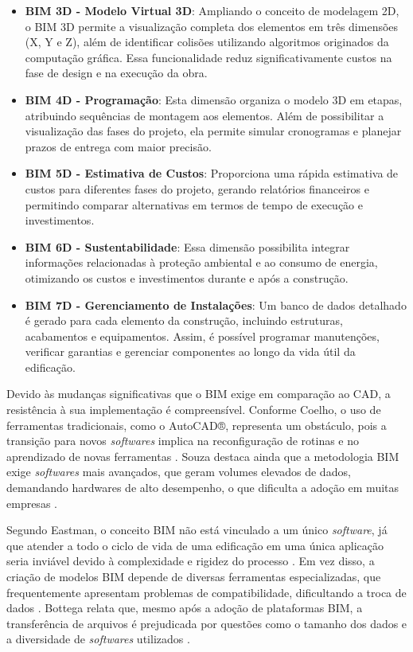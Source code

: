 \begin{itemize}

\item \textbf{BIM 3D - Modelo Virtual 3D}: Ampliando o conceito de modelagem 2D, o BIM 3D permite a visualização completa dos elementos em três dimensões (X, Y e Z), além de identificar colisões utilizando algoritmos originados da computação gráfica. Essa funcionalidade reduz significativamente custos na fase de design e na execução da obra.

\item \textbf{BIM 4D - Programação}: Esta dimensão organiza o modelo 3D em etapas, atribuindo sequências de montagem aos elementos. Além de possibilitar a visualização das fases do projeto, ela permite simular cronogramas e planejar prazos de entrega com maior precisão.

\item \textbf{BIM 5D - Estimativa de Custos}: Proporciona uma rápida estimativa de custos para diferentes fases do projeto, gerando relatórios financeiros e permitindo comparar alternativas em termos de tempo de execução e investimentos.

\item \textbf{BIM 6D - Sustentabilidade}: Essa dimensão possibilita integrar informações relacionadas à proteção ambiental e ao consumo de energia, otimizando os custos e investimentos durante e após a construção.

\item \textbf{BIM 7D - Gerenciamento de Instalações}: Um banco de dados detalhado é gerado para cada elemento da construção, incluindo estruturas, acabamentos e equipamentos. Assim, é possível programar manutenções, verificar garantias e gerenciar componentes ao longo da vida útil da edificação.

\end{itemize}

Devido às mudanças significativas que o BIM exige em comparação ao CAD, a resistência à sua implementação é compreensível. Conforme Coelho, o uso de ferramentas tradicionais, como o AutoCAD®, representa um obstáculo, pois a transição para novos \textit{softwares} implica na reconfiguração de rotinas e no aprendizado de novas ferramentas \cite{coelho2018}. Souza destaca ainda que a metodologia BIM exige \textit{softwares} mais avançados, que geram volumes elevados de dados, demandando hardwares de alto desempenho, o que dificulta a adoção em muitas empresas \cite{souza2009}.

Segundo Eastman, o conceito BIM não está vinculado a um único \textit{software}, já que atender a todo o ciclo de vida de uma edificação em uma única aplicação seria inviável devido à complexidade e rigidez do processo \cite{eastman2011}. Em vez disso, a criação de modelos BIM depende de diversas ferramentas especializadas, que frequentemente apresentam problemas de compatibilidade, dificultando a troca de dados \cite{ibrahim2004}. Bottega relata que, mesmo após a adoção de plataformas BIM, a transferência de arquivos é prejudicada por questões como o tamanho dos dados e a diversidade de \textit{softwares} utilizados \cite{bottega2012}.

